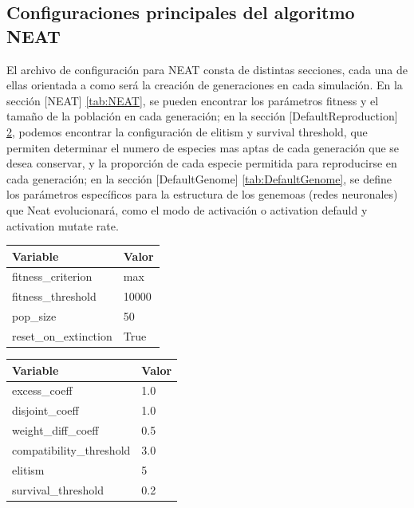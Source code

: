 \documentclass[conference]{IEEEtran}
\begin{document}
\subsection{Configuraciones principales del algoritmo NEAT}
El archivo de configuración para NEAT consta de distintas secciones, cada una de ellas orientada a como será la creación de generaciones en cada simulación. En la sección [NEAT] \ref{tab:NEAT}, se pueden encontrar los parámetros fitness y el tamaño de la población en cada generación; en la sección [DefaultReproduction] \ref{tab:DefaultReproduction}, podemos encontrar la configuración de elitism y survival threshold, que permiten determinar el numero de especies mas aptas de cada generación que se desea conservar, y la proporción de cada especie permitida para reproducirse en cada generación; en la sección [DefaultGenome] \ref{tab:DefaultGenome}, se define los parámetros específicos para la estructura de los genemoas (redes neuronales) que Neat evolucionará, como el modo de activación o activation defauld y activation mutate rate.
\begin{table}[ht]
    \centering
    \label{tab:NEAT}
    \begin{tabular}{ll}
    \toprule
    \textbf{Variable} & \textbf{Valor} \\
    \midrule
    fitness\_criterion     & max \\
    fitness\_threshold     & 10000 \\
    pop\_size              & 50 \\
    reset\_on\_extinction  & True  \\
    \bottomrule
    \end{tabular}
    \vspace{0.5cm}
    
    \label{tab:DefaultReproduction}
    \begin{tabular}{ll}
    \toprule
    \textbf{Variable} & \textbf{Valor} \\
    \midrule
    excess\_coeff            & 1.0 \\
    disjoint\_coeff          & 1.0 \\
    weight\_diff\_coeff      & 0.5 \\
    compatibility\_threshold & 3.0 \\
    elitism                  & 5 \\
    survival\_threshold      & 0.2 \\
    \bottomrule
    \end{tabular}
    \vspace{0.5cm}
\end{table}
\end{document}
